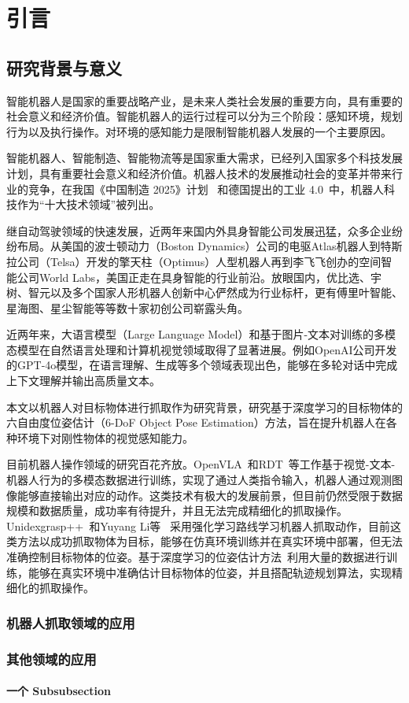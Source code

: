 \chapter{引言}
\section{研究背景与意义}
\par 智能机器人是国家的重要战略产业，是未来人类社会发展的重要方向，具有重要的社会意义和经济价值。智能机器人的运行过程可以分为三个阶段：感知环境，规划行为以及执行操作。对环境的感知能力是限制智能机器人发展的一个主要原因。
\par 智能机器人、智能制造、智能物流等是国家重大需求，已经列入国家多个科技发展计划，具有重要社会意义和经济价值。机器人技术的发展推动社会的变革并带来行业的竞争，在我国《中国制造 2025》计划~\cite{中国制造2025} 和德国提出的工业 4.0~\cite{德国工业4.0}中，机器人科技作为“十大技术领域”被列出。
\par 继自动驾驶领域的快速发展，近两年来国内外具身智能公司发展迅猛，众多企业纷纷布局。从美国的波士顿动力（Boston Dynamics）公司的电驱Atlas机器人到特斯拉公司（Telsa）开发的擎天柱（Optimus）人型机器人再到李飞飞创办的空间智能公司World Labs，美国正走在具身智能的行业前沿。放眼国内，优比选、宇树、智元以及多个国家人形机器人创新中心俨然成为行业标杆，更有傅里叶智能、星海图、星尘智能等等数十家初创公司崭露头角。
\par 近两年来，大语言模型（Large Language Model）和基于图片-文本对训练的多模态模型在自然语言处理和计算机视觉领域取得了显著进展。例如OpenAI公司开发的GPT-4o模型，在语言理解、生成等多个领域表现出色，能够在多轮对话中完成上下文理解并输出高质量文本。
\par 本文以机器人对目标物体进行抓取作为研究背景，研究基于深度学习的目标物体的六自由度位姿估计（6-DoF Object Pose Estimation）方法，旨在提升机器人在各种环境下对刚性物体的视觉感知能力。
\par 目前机器人操作领域的研究百花齐放。OpenVLA~\cite{openvla}和RDT~\cite{liu2024rdt}等工作基于视觉-文本-机器人行为的多模态数据进行训练，实现了通过人类指令输入，机器人通过观测图像能够直接输出对应的动作。这类技术有极大的发展前景，但目前仍然受限于数据规模和数据质量，成功率有待提升，并且无法完成精细化的抓取操作。Unidexgrasp++~\cite{wan2023unidexgrasp++}和Yuyang Li等~\cite{li2024grasp} 采用强化学习路线学习机器人抓取动作，目前这类方法以成功抓取物体为目标，能够在仿真环境训练并在真实环境中部署，但无法准确控制目标物体的位姿。基于深度学习的位姿估计方法~\cite{hodan2024bop}利用大量的数据进行训练，能够在真实环境中准确估计目标物体的位姿，并且搭配轨迹规划算法，实现精细化的抓取操作。
\subsection{机器人抓取领域的应用}
\subsection{其他领域的应用}
\subsubsection{一个 Subsubsection}
